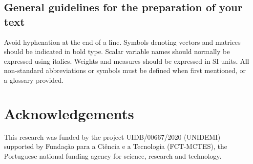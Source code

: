 \documentclass[3p,times,procedia]{elsarticle}
\begin{document}
\subsection{General guidelines for the preparation of your text}
Avoid hyphenation at the end of a line. Symbols denoting vectors and matrices should be indicated in bold type. Scalar variable names should normally be expressed using italics. Weights and measures should be expressed in SI units. All non-standard abbreviations or symbols must be defined when first mentioned, or a glossary provided.



\section*{Acknowledgements}

This research was funded by the project UIDB/00667/2020 (UNIDEMI) supported
by Fundação para a Ciência e a Tecnologia (FCT-MCTES), the Portuguese
national funding agency for science, research and technology.



%
\end{document}
